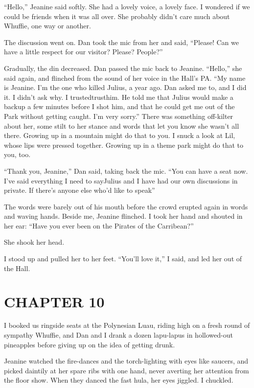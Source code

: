 “Hello,” Jeanine said softly. She had a lovely voice, a lovely
face. I wondered if we could be friends when it was all over. She
probably didn't care much about Whuffie, one way or another.

The discussion went on. Dan took the mic from her and said,
“Please! Can we have a little respect for our visitor? Please?
People?”

Gradually, the din decreased. Dan passed the mic back to Jeanine.
“Hello,” she said again, and flinched from the sound of her voice
in the Hall's PA. “My name is Jeanine. I'm the one who killed
Julius, a year ago. Dan asked me to, and I did it. I didn't ask
why. I trusted{\dash}trust{\dash}him. He told me that Julius would make a
backup a few minutes before I shot him, and that he could get me
out of the Park without getting caught. I'm very sorry.” There was
something off-kilter about her, some stilt to her stance and words
that let you know she wasn't all there. Growing up in a mountain
might do that to you. I snuck a look at Lil, whose lips were
pressed together. Growing up in a theme park might do that to you,
too.

“Thank you, Jeanine,” Dan said, taking back the mic. “You can have
a seat now. I've said everything I need to say{\dash}Julius and I have
had our own discussions in private. If there's anyone else who'd
like to speak{\dash}”

The words were barely out of his mouth before the crowd erupted
again in words and waving hands. Beside me, Jeanine flinched. I
took her hand and shouted in her ear: “Have you ever been on the
Pirates of the Carribean?”

She shook her head.

I stood up and pulled her to her feet. “You'll love it,” I said,
and led her out of the Hall.

\section{CHAPTER 10}

I booked us ringside seats at the Polynesian Luau, riding high on a
fresh round of sympathy Whuffie, and Dan and I drank a dozen
lapu-lapus in hollowed-out pineapples before giving up on the idea
of getting drunk.

Jeanine watched the fire-dances and the torch-lighting with eyes
like saucers, and picked daintily at her spare ribs with one hand,
never averting her attention from the floor show. When they danced
the fast hula, her eyes jiggled. I chuckled.

